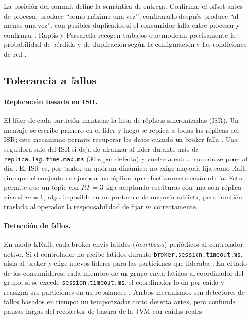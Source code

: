 \documentclass[11pt,a4paper]{article}
\begin{document}
La posición del commit define la semántica de entrega. Confirmar el offset antes de procesar produce \enquote{como máximo una vez}; confirmarlo después produce \enquote{al menos una vez}, con posibles duplicados si el consumidor falla entre procesar y confirmar \cite{kafkadocs}. Raptis y Passarella recogen trabajos que modelan precisamente la probabilidad de pérdida y de duplicación según la configuración y las condiciones de red \cite{raptis2023survey}.

\subsection{Tolerancia a fallos}
\label{sec:fallos}

\paragraph{Replicación basada en ISR.}
El líder de cada partición mantiene la lista de réplicas sincronizadas (ISR). Un mensaje se escribe primero en el líder y luego se replica a todas las réplicas del ISR; este mecanismo permite recuperar los datos cuando un broker falla \cite{zhou2024distributed}. Una seguidora sale del ISR si deja de alcanzar al líder durante más de \texttt{replica.lag.time.max.ms} (30 s por defecto) y vuelve a entrar cuando se pone al día \cite{kafkadocs}. El ISR es, por tanto, un quórum dinámico: no exige mayoría fija como Raft, sino que el conjunto se ajusta a las réplicas que efectivamente están al día. Esto permite que un topic con $RF=3$ siga aceptando escrituras con una sola réplica viva si $m=1$, algo imposible en un protocolo de mayoría estricta, pero también traslada al operador la responsabilidad de fijar $m$ correctamente.

\paragraph{Detección de fallos.}
En modo KRaft, cada broker envía latidos (\emph{heartbeats}) periódicos al controlador activo. Si el controlador no recibe latidos durante \texttt{broker.session.timeout.ms}, aísla al broker y elige nuevos líderes para las particiones que lideraba \cite{kafkadocs,kip500}. En el lado de los consumidores, cada miembro de un grupo envía latidos al coordinador del grupo; si se excede \texttt{session.timeout.ms}, el coordinador lo da por caído y reasigna sus particiones en un rebalanceo \cite{kafkadocs}. Ambos mecanismos son detectores de fallos basados en tiempo: un temporizador corto detecta antes, pero confunde pausas largas del recolector de basura de la JVM con caídas reales.
\end{document}
